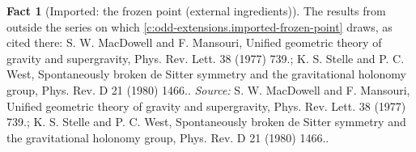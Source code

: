 \documentclass[11pt]{article}
\theoremstyle{definition}
\newtheorem{fact}[theorem]{Fact}
\theoremstyle{plain}
\begin{document}
\begin{fact}[Imported: the frozen point (external ingredients)]\label{c:odd-extensions.imported-frozen-point-external}
The results from outside the series on which \ref{c:odd-extensions.imported-frozen-point} draws, as cited there: S. W. MacDowell and F. Mansouri, Unified geometric theory of gravity and supergravity, Phys. Rev. Lett. 38 (1977) 739.; K. S. Stelle and P. C. West, Spontaneously broken de Sitter symmetry and the gravitational holonomy group, Phys. Rev. D 21 (1980) 1466..
\emph{Source:} S. W. MacDowell and F. Mansouri, Unified geometric theory of gravity and supergravity, Phys. Rev. Lett. 38 (1977) 739.; K. S. Stelle and P. C. West, Spontaneously broken de Sitter symmetry and the gravitational holonomy group, Phys. Rev. D 21 (1980) 1466..
\end{fact}
\end{document}
